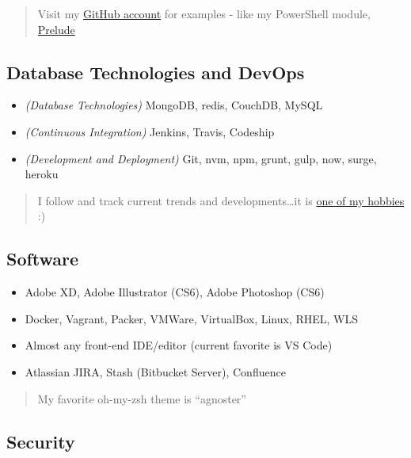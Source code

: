 \documentclass[10pt]{article}
\def\tightlist{}
\begin{document}
\begin{quote}
Visit my \href{https://github.com/jhwohlgemuth}{GitHub account} for
examples - like my PowerShell module,
\href{https://github.com/jhwohlgemuth/pwsh-prelude}{Prelude}
\end{quote}

\hypertarget{database-technologies-and-devops}{%
\subsection{Database Technologies and
DevOps}\label{database-technologies-and-devops}}

\begin{itemize}
\tightlist
\item
  \emph{(Database Technologies)} MongoDB, redis, CouchDB, MySQL
\item
  \emph{(Continuous Integration)} Jenkins, Travis, Codeship
\item
  \emph{(Development and Deployment)} Git, nvm, npm, grunt, gulp, now,
  surge, heroku
\end{itemize}

\begin{quote}
I follow and track current trends and developments\ldots it is
\href{https://twitter.com/jhwohlgemuth}{one of my hobbies} :)
\end{quote}

\hypertarget{software}{%
\subsection{Software}\label{software}}

\begin{itemize}
\tightlist
\item
  Adobe XD, Adobe Illustrator (CS6), Adobe Photoshop (CS6)
\item
  Docker, Vagrant, Packer, VMWare, VirtualBox, Linux, RHEL, WLS
\item
  Almost any front-end IDE/editor (current favorite is VS Code)
\item
  Atlassian JIRA, Stash (Bitbucket Server), Confluence
\end{itemize}

\begin{quote}
My favorite oh-my-zsh theme is ``agnoster''
\end{quote}

\hypertarget{security}{%
\subsection{Security}\label{security}}
\end{document}
